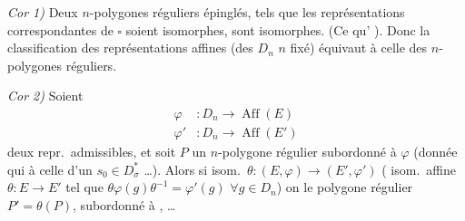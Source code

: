 \documentclass[11pt,a4paper]{article}
\begin{document}
\emph{Cor 1)} Deux $n$-polygones réguliers \struck{\ill{}} épinglés, tels que
les représentations correspondantes de $\square$ soient isomorphes, sont
isomorphes. (Ce  qu'\ill{} \ill{} \ill{}). Donc la
classification des représentations affines \uncertain{\ill{}}
 (des  $D_n$  $n$
fixé) équivaut à celle des $n$-polygones réguliers.

\emph{Cor 2)} Soient
\[
  \begin{aligned}
    \varphi &\colon D_n \longrightarrow \operatorname{Aff}(E) \\
    \varphi' &\colon D_n \longrightarrow \operatorname{Aff}(E')
  \end{aligned}
\]
deux repr.\ admissibles, et soit $P$ un $n$-polygone régulier subordonné à
$\varphi$ (donnée qui  à celle d'un
$s_0 \in D_\sigma^{*}$ …). Alors si \ill{} isom.\ $\theta \colon (E, \varphi) \to
(E', \varphi')$ ( isom.\ affine $\theta \colon E \to E'$ tel
que $\theta \varphi(g) \theta^{-1} = \varphi'(g)$ $\forall g \in D_n$) on
 le polygone régulier $P' = \theta(P)$, subordonné à
, …
\end{document}
